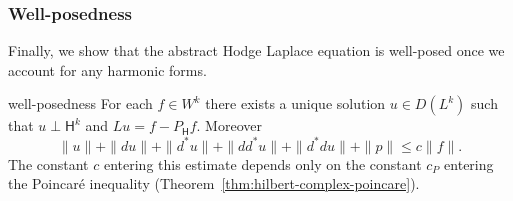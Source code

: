 \subsubsection{{Well-posedness}}\label{subsec:hodge-well-posedness}

{Finally, we show that the abstract Hodge Laplace equation is well-posed once we account for any harmonic forms.}

\begin{Theorem}{{well-posedness}}\label{thm:hodge-well-posedness}
{For each $f\in W^k$ there exists a unique solution $u\in D(L^k)$ such that $u\perp\mathsf H^k$ and $Lu=f-P_{\mathsf H}f$. Moreover}
\[
\|u\|+\|du\|+\|d^*u\|+\|dd^*u\|+\|d^*du\|+\|p\|\leq c\|f\|.
\]
{The constant $c$ entering this estimate depends only on the constant $c_P$ entering the Poincaré inequality (Theorem~\ref{thm:hilbert-complex-poincare}).}
\end{Theorem}

